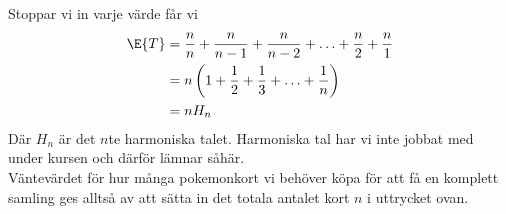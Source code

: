 \documentclass[nobib]{tufte-handout}
\begin{document}
Stoppar vi in varje värde får vi
    \begin{align*}
        \E{T} &= \frac{n}{n} + \frac{n}{n-1} + \frac{n}{n-2} + \ldots + \frac{n}{2} + \frac{n}{1}\\
        &= n \left(1 + \frac{1}{2} + \frac{1}{3} + \ldots + \frac{1}{n} \right)\\
        &= nH_n
    \end{align*}
Där $H_n$ är det $n$te harmoniska talet. Harmoniska tal har vi inte jobbat med under kursen och därför lämnar såhär.\\
Väntevärdet för hur många pokemonkort vi behöver köpa för att få en komplett samling ges alltså av att sätta in det totala antalet kort $n$ i uttrycket ovan.


%
%
\end{document}
